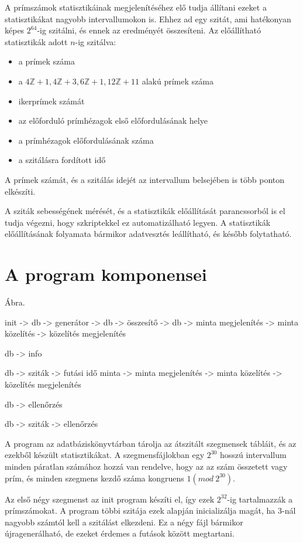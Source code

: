 A prímszámok statisztikáinak megjelenítéséhez
elő tudja állítani ezeket a statisztikákat nagyobb intervallumokon is.
Ehhez ad egy szitát, ami hatékonyan képes $2^{64}$-ig szitálni,
és ennek az eredményét összesíteni. Az előállítható statisztikák
adott $n$-ig szitálva:
\begin{itemize}
\item a prímek száma
\item a $4\mathbb{Z}+1, 4\mathbb{Z}+3, 6\mathbb{Z}+1, 12\mathbb{Z}+11$
	alakú prímek száma
\item ikerprímek számát
\item az előforduló prímhézagok első előfordulásának helye
\item a prímhézagok előfordulásának száma
\item a szitálásra fordított idő
\end{itemize}

A prímek számát, és a szitálás idejét az intervallum belsejében is több ponton elkészíti.

A sziták sebességének mérését, és a statisztikák előállítását
parancssorból is el tudja végezni, hogy szkriptekkel ez automatizálható legyen.
A statisztikák előállításának folyamata
bármikor adatvesztés leállítható, és később folytatható.

\section{A program komponensei}

{\color{red}Ábra.

init -> db -> generátor -> db -> összesítő -> db -> minta megjelenítés -> minta közelítés -> közelítés megjelenítés

db -> info

db -> sziták -> futási idő minta -> minta megjelenítés -> minta közelítés -> közelítés megjelenítés

db -> ellenőrzés

db -> sziták -> ellenőrzés
}

A program az adatbáziskönyvtárban tárolja az átszitált szegmensek tábláit,
és az ezekből készült statisztikákat. A szegmensfájlokban egy $2^{30}$ hosszú
intervallum minden páratlan számához hozzá van rendelve, hogy az az szám
összetett vagy prím, és minden szegmens kezdő száma kongruens $1 (mod\ 2^{30})$.

Az első négy szegmenst az init program készíti el, így ezek $2^{32}$-ig tartalmazzák
a prímszámokat. A program többi szitája ezek alapján inicializálja magát,
ha $3$-nál nagyobb számtól kell a szitálást elkezdeni.
Ez a négy fájl bármikor újragenerálható, de ezeket érdemes a futások között megtartani.

